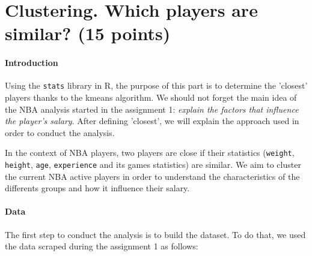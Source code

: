 
\section*{Clustering. Which players are similar? (15 points)}
\label{subsec:3Q1}

\paragraph{Introduction}Using the \texttt{stats} library in R, the purpose of this part is to determine the 'closest' players thanks to the kmeans algorithm. We should not forget the main idea of the NBA analysis started in the assignment 1: \textit{explain the factors that influence the player's salary}. After defining 'closest', we will explain the approach used in order to conduct the analysis.

In the context of NBA players, two players are close if their statistics (\texttt{weight}, \texttt{height}, \texttt{age}, \texttt{experience} and its games statistics) are similar. We aim to cluster the current NBA active players in order to understand the characteristics of the differents groups and how it influence their salary.

\paragraph{Data}The first step to conduct the analysis is to build the dataset. To do that, we used the data scraped during the assignment 1 as follows:

